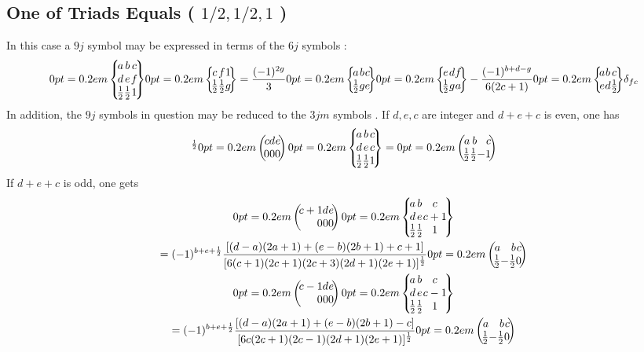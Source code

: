 \subsection{One of Triads Equals ( $1 / 2,1 / 2,1$ )}\label{sec:10.9.3}
In this case a $9 j$ symbol may be expressed in terms of the $6 j$ symbols \cite{ref016}:
\begin{equation}
\ninej{a}{b}{c  \label{eq:10:9:9}}{d}{e}{f}{\frac{1}{2}}{\frac{1}{2}}{1}\sixj{c}{f}{1}{\frac{1}{2}}{\frac{1}{2}}{g}=\frac{(-1)^{2 g}}{3}\sixj{a}{b}{c}{\frac{1}{2}}{g}{e}\sixj{e}{d}{f}{\frac{1}{2}}{g}{a}-\frac{(-1)^{b+d-g}}{6(2 c+1)}\sixj{a}{b}{c}{e}{d}{\frac{1}{2}} \delta_{f c}
\end{equation}
In addition, the $9 j$ symbols in question may be reduced to the $3 j m$ symbols \cite{ref009}. If $d, e, c$ are integer and $d+e+c$ is even, one has
\begin{equation}
[6(2 c+1)(2 d+1)(2 e+1)]^{\frac{1}{2}}\threej{c }{ d }{ e  \label{eq:10:9:10}}{0 }{ 0 }{ 0}\ninej{a}{b}{c}{d}{e}{c}{\frac{1}{2}}{\frac{1}{2}}{1}=\threej{a }{ b }{ c }{\frac{1}{2} }{ \frac{1}{2} }{ -1}
\end{equation}
If $d+e+c$ is odd, one gets
\begin{gather}
\threej{c+1 }{ d }{ e }{0 }{ 0 }{ 0}\ninej{a}{b}{c}{d}{e}{c+1}{\frac{1}{2}}{\frac{1}{2}}{1}  \notag\\
=(-1)^{b+e+\frac{1}{2}} \frac{[(d-a)(2 a+1)+(e-b)(2 b+1)+c+1]}{[6(c+1)(2 c+1)(2 c+3)(2 d+1)(2 e+1)]^{\frac{1}{2}}}\threej{a }{ b }{ c }{\frac{1}{2} }{ -\frac{1}{2} }{ 0}  \label{eq:10:9:11}\\
\threej{c-1 }{ d }{ e }{0 }{ 0 }{ 0}\ninej{a}{b}{c}{d}{e}{c-1}{\frac{1}{2}}{\frac{1}{2}}{1}  \notag\\
=(-1)^{b+e+\frac{1}{2}} \frac{[(d-a)(2 a+1)+(e-b)(2 b+1)-c]}{[6 c(2 c+1)(2 c-1)(2 d+1)(2 e+1)]^{\frac{1}{2}}}\threej{a }{ b }{ c }{\frac{1}{2} }{ -\frac{1}{2} }{ 0} \label{eq:10:9:12}
\end{gather}
